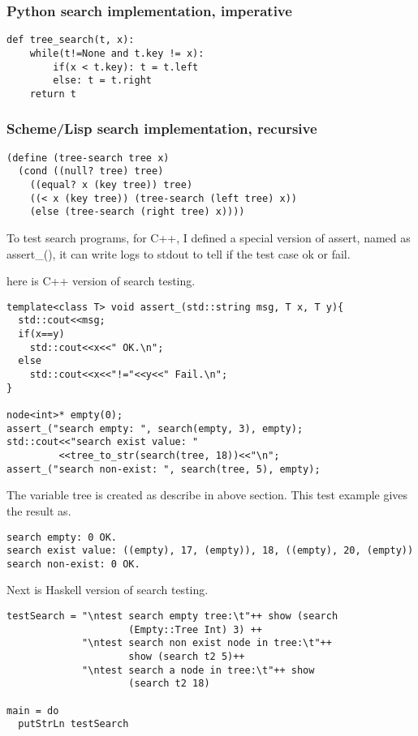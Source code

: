 \documentclass{article}
\begin{document}
\subsubsection*{Python search implementation, imperative}
\lstset{language=Python}
\begin{lstlisting}
def tree_search(t, x):
    while(t!=None and t.key != x):
        if(x < t.key): t = t.left
        else: t = t.right
    return t
\end{lstlisting}

\subsubsection*{Scheme/Lisp search implementation, recursive}
\lstset{language=lisp}
\begin{lstlisting}
(define (tree-search tree x)
  (cond ((null? tree) tree)
	((equal? x (key tree)) tree)
	((< x (key tree)) (tree-search (left tree) x))
	(else (tree-search (right tree) x))))
\end{lstlisting}

To test search programs, for C++, I defined a special version of assert, named
as assert\_(), it can write logs to stdout to tell if the test case ok or fail.

here is C++ version of search testing.

\lstset{language=c++}
\begin{lstlisting}
template<class T> void assert_(std::string msg, T x, T y){
  std::cout<<msg;
  if(x==y)
    std::cout<<x<<" OK.\n";
  else
    std::cout<<x<<"!="<<y<<" Fail.\n";
}

node<int>* empty(0);
assert_("search empty: ", search(empty, 3), empty);
std::cout<<"search exist value: "
         <<tree_to_str(search(tree, 18))<<"\n";
assert_("search non-exist: ", search(tree, 5), empty);
\end{lstlisting}

The variable tree is created as describe in above section. This test example 
gives the result as.
\begin{verbatim}
search empty: 0 OK.
search exist value: ((empty), 17, (empty)), 18, ((empty), 20, (empty))
search non-exist: 0 OK.
\end{verbatim}

Next is Haskell version of search testing.

\lstset{language=Haskell}
\begin{lstlisting}
testSearch = "\ntest search empty tree:\t"++ show (search 
                     (Empty::Tree Int) 3) ++
             "\ntest search non exist node in tree:\t"++ 
                     show (search t2 5)++
             "\ntest search a node in tree:\t"++ show 
                     (search t2 18)

main = do
  putStrLn testSearch
\end{lstlisting}
\end{document}
